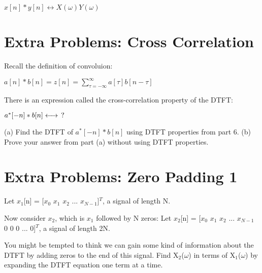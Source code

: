 \documentclass[11pt]{article}
\begin{document}
\begin{center}

$
x[n] * y[n] \longleftrightarrow X(\omega) Y(\omega)
$
\end{center}



\newpage

\section{Extra Problems: Cross Correlation}

Recall the definition of convoluion:
\vspace{1mm}
\begin{center}
$
a[n] * b[n] = z[n] =  \sum_{\tau = -\infty}^{\infty} a[\tau] b[n - \tau]
$

\end{center}

\vspace{4mm}

There is an expression called the cross-correlation property of the DTFT:
\vspace{3mm}
\begin{center}
$
a^{*}[-n] * b[n] \longleftrightarrow \hspace{1.5mm} ?
$

\end{center}

\vspace{5mm}

(a) Find the DTFT of $a^{*}[-n] * b[n]$ using DTFT properties from part 6.\newline
(b) Prove your answer from part (a) without using DTFT properties.



\section{Extra Problems: Zero Padding 1}

Let $x_1$[n] = [$x_0$ $x_1$ $x_2$ ... $x_{N-1}$]$^{T}$, a signal of length N.\newline

Now consider $x_2$, which is $x_1$ followed by N zeros: \newline
Let $x_2$[n] = [$x_0$ $x_1$ $x_2$ ... $x_{N-1}$ 0 0 0 ... 0]$^{T}$, a signal of length 2N.\newline

You might be tempted to think we can gain some kind of information about the DTFT by adding zeros to the end of this signal. Find X$_2$($\omega$) in terms of X$_1$($\omega$) by expanding the DTFT equation one term at a time.
\end{document}
